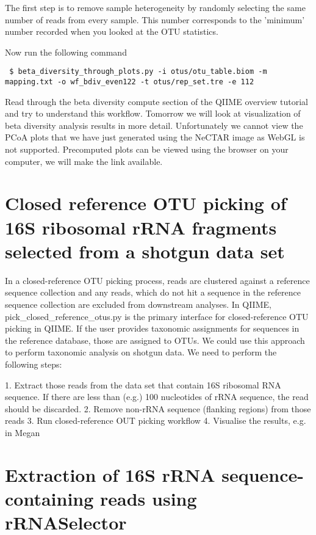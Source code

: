 \documentclass[a4paper,12pt,twoside]{memoir}
\begin{document}
\begin{steps}
 The first step is to remove sample heterogeneity by randomly selecting the same number of reads from every sample. This number corresponds to the 'minimum' number recorded when you looked at the OTU statistics. 

 Now run the following command 
\begin{lstlisting}
 $ beta_diversity_through_plots.py -i otus/otu_table.biom -m mapping.txt -o wf_bdiv_even122 -t otus/rep_set.tre -e 112
\end{lstlisting}

 Read through the beta diversity compute section of the QIIME overview tutorial and try to understand this workflow. Tomorrow we will look at visualization of beta diversity analysis results in more detail. Unfortunately we cannot view the PCoA plots that we have just generated using the NeCTAR image as WebGL is not supported. Precomputed plots can be viewed using the browser on your computer, we will make the link available.
\end{steps}

\section{Closed reference OTU picking of 16S ribosomal rRNA fragments selected from a shotgun data set} 

\begin{information}
 In a closed-reference OTU picking process, reads are clustered against a reference sequence collection and any reads, which do not hit a sequence in the reference sequence collection are excluded from downstream analyses. In QIIME, pick\_closed\_reference\_otus.py is the primary interface for closed-reference OTU picking in QIIME. If the user provides taxonomic assignments for sequences in the reference database, those are assigned to OTUs. We could use this approach to perform taxonomic analysis on shotgun data. We need to perform the following steps:
 
 1. Extract those reads from the data set that contain 16S ribosomal RNA sequence. If there are less than (e.g.) 100 nucleotides of rRNA sequence, the read should be discarded.
 2. Remove non-rRNA sequence (flanking regions) from those reads
 3. Run closed-reference OUT picking workflow
 4. Visualise the results, e.g. in Megan
\end{information}

\newpage

\section{Extraction of 16S rRNA sequence-containing reads using rRNASelector}
\end{document}

